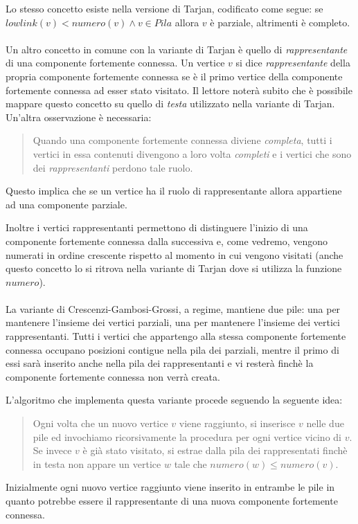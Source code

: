 Lo stesso concetto esiste nella versione di Tarjan, codificato come
segue: se $lowlink(v) < numero(v) \wedge v \in Pila$ allora $v$ \`e
parziale, altrimenti \`e completo.
\\\\
Un altro concetto in comune con la variante di Tarjan \`e quello di
\emph{rappresentante} di una componente fortemente connessa. Un
vertice $v$ si dice \emph{rappresentante} della propria componente
fortemente connessa se \`e il primo vertice della componente
fortemente connessa ad esser stato visitato. Il lettore noter\`a
subito che \`e possibile mappare questo concetto su quello di
\emph{testa} utilizzato nella variante di Tarjan. Un'altra
osservazione \`e necessaria:
\begin{quotation}
  Quando una componente fortemente connessa diviene \emph{completa},
  tutti i vertici in essa contenuti divengono a loro volta
  \emph{completi} e i vertici che sono dei \emph{rappresentanti}
  perdono tale ruolo.
\end{quotation}
Questo implica che se un vertice ha il ruolo di rappresentante allora
appartiene ad una componente parziale.

Inoltre i vertici rappresentanti permettono di distinguere l'inizio di
una componente fortemente connessa dalla successiva e, come vedremo,
vengono numerati in ordine crescente rispetto al momento in cui
vengono visitati (anche questo concetto lo si ritrova nella variante
di Tarjan dove si utilizza la funzione $numero$).
\\\\
La variante di Crescenzi-Gambosi-Grossi, a regime, mantiene due pile:
una per mantenere l'insieme dei vertici parziali, una per mantenere
l'insieme dei vertici rappresentanti. Tutti i vertici che appartengo
alla stessa componente fortemente connessa occupano posizioni contigue
nella pila dei parziali, mentre il primo di essi sar\`a inserito anche
nella pila dei rappresentanti e vi rester\`a finch\`e la componente
fortemente connessa non verr\`a creata.

L'algoritmo che implementa questa variante procede seguendo la
seguente idea:
\begin{quotation}
  Ogni volta che un nuovo vertice $v$ viene raggiunto, si inserisce
  $v$ nelle due pile ed invochiamo ricorsivamente la procedura per
  ogni vertice vicino di $v$. Se invece $v$ \`e gi\`a stato visitato,
  si estrae dalla pila dei rappresentati finch\`e in testa non appare
  un vertice $w$ tale che $numero(w) \leq numero(v)$.
\end{quotation}
Inizialmente ogni nuovo vertice raggiunto viene inserito in entrambe
le pile in quanto potrebbe essere il rappresentante di una nuova
componente fortemente connessa.

